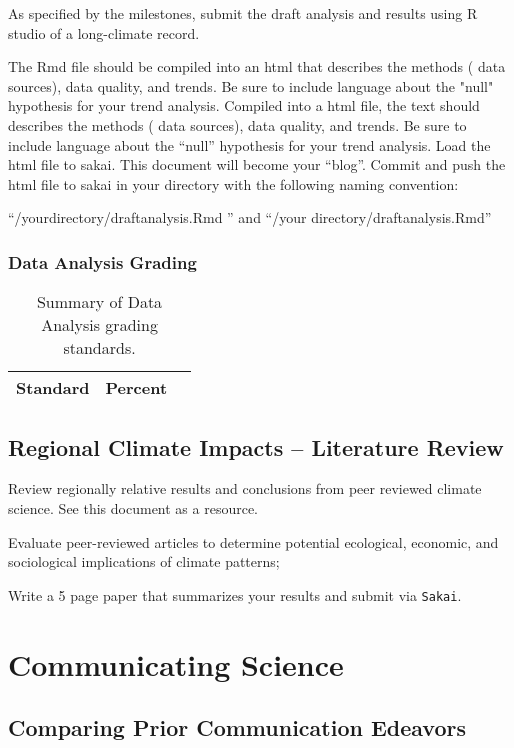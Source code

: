 \documentclass{article}\usepackage[]{graphicx}\usepackage[]{color}
\begin{document}
As specified by the milestones, submit the draft analysis and results using R studio of a long-climate record. 


The Rmd file should be compiled into an html that describes the methods ( data sources), data quality, and trends. Be sure to include language about the "null" hypothesis for your trend analysis. Compiled into a html file, the text should describes the methods ( data sources), data quality, and trends. Be sure to include language about the ``null'' hypothesis for your trend analysis. Load the html file to sakai. This document will become your ``blog''. Commit and push the html file to sakai in your directory with the following naming convention:

``/yourdirectory/draftanalysis.Rmd '' and ``/your directory/draftanalysis.Rmd''

\subsubsection{Data Analysis Grading}

\begin{table}[h]
\caption{Summary of Data Analysis grading standards.}
\label{tab:datagrading}
\begin{tabular}{lll}\hline
Standard      &   Percent   & \\ \hline\hline
\hline
\end{tabular}
\end{table}


\subsection{Regional Climate Impacts -- Literature Review}

Review regionally relative results and conclusions from peer reviewed climate science. See this document as a resource.

Evaluate peer-reviewed articles to determine potential ecological, economic, and sociological implications of climate patterns;

Write a 5 page paper that summarizes your results and submit via \texttt{Sakai}.

\section{Communicating Science}

\subsection{Comparing Prior Communication Edeavors}
\end{document}
